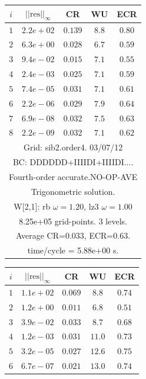 \begin{table}[hbt]
\begin{center}
{\tablefontsize
\begin{tabular}{|c|c|c|c|c|} \hline 
 $i$   & $\vert\vert\mbox{res}\vert\vert_\infty$  &  CR     &  WU    & ECR  \\   \hline 
 $ 1$  & $ 2.2e+02$ & $0.139$ & $ 8.8$ & $0.80$ \\ 
 $ 2$  & $ 6.3e+00$ & $0.028$ & $ 6.7$ & $0.59$ \\ 
 $ 3$  & $ 9.4e-02$ & $0.015$ & $ 7.1$ & $0.55$ \\ 
 $ 4$  & $ 2.4e-03$ & $0.025$ & $ 7.1$ & $0.59$ \\ 
 $ 5$  & $ 7.4e-05$ & $0.031$ & $ 7.1$ & $0.61$ \\ 
 $ 6$  & $ 2.2e-06$ & $0.029$ & $ 7.9$ & $0.64$ \\ 
 $ 7$  & $ 6.9e-08$ & $0.032$ & $ 7.5$ & $0.63$ \\ 
 $ 8$  & $ 2.2e-09$ & $0.032$ & $ 7.1$ & $0.62$ \\ 
\hline 
\multicolumn{5}{|c|}{Grid: sib2.order4. 03/07/12}  \\
\multicolumn{5}{|c|}{BC: DDDDDD+IIIIDI+IIIIDI....}  \\
\multicolumn{5}{|c|}{Fourth-order accurate.NO-OP-AVE}  \\
\multicolumn{5}{|c|}{Trigonometric solution.}  \\
\multicolumn{5}{|c|}{W[2,1]: rb $\omega=1.20$, lz3 $\omega=1.00$}  \\
\multicolumn{5}{|c|}{8.25e+05 grid-points. 3 levels.}  \\
\multicolumn{5}{|c|}{Average CR=$0.033$, ECR=$0.63$.}  \\
\multicolumn{5}{|c|}{time/cycle = 5.88e+00 s.}  \\
\hline 
\end{tabular}
\begin{tabular}{|c|c|c|c|c|} \hline 
 $i$   & $\vert\vert\mbox{res}\vert\vert_\infty$  &  CR     &  WU    & ECR  \\   \hline 
 $ 1$  & $ 1.1e+02$ & $0.069$ & $ 8.8$ & $0.74$ \\ 
 $ 2$  & $ 1.2e+00$ & $0.011$ & $ 6.8$ & $0.51$ \\ 
 $ 3$  & $ 3.9e-02$ & $0.033$ & $ 8.7$ & $0.68$ \\ 
 $ 4$  & $ 1.2e-03$ & $0.031$ & $11.0$ & $0.73$ \\ 
 $ 5$  & $ 3.2e-05$ & $0.027$ & $12.6$ & $0.75$ \\ 
 $ 6$  & $ 6.7e-07$ & $0.021$ & $13.0$ & $0.74$ \\ 

\end{tabular}}
\end{center}
\end{table}
